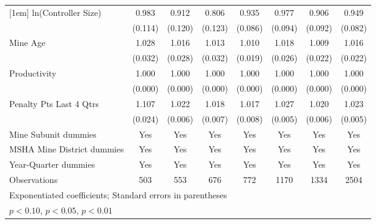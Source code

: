 {\begin{tabular}{l*{7}{c}}
[1em]
ln(Controller Size)      &       0.983         &       0.912         &       0.806         &       0.935         &       0.977         &       0.906         &       0.949         \\
                         &     (0.114)         &     (0.120)         &     (0.123)         &     (0.086)         &     (0.094)         &     (0.092)         &     (0.082)         \\
[1em]
Mine Age                 &       1.028         &       1.016         &       1.013         &       1.010         &       1.018         &       1.009         &       1.016         \\
                         &     (0.032)         &     (0.028)         &     (0.032)         &     (0.019)         &     (0.026)         &     (0.022)         &     (0.022)         \\
[1em]
Productivity             &       1.000         &       1.000         &       1.000         &       1.000         &       1.000         &       1.000         &       1.000         \\
                         &     (0.000)         &     (0.000)         &     (0.000)         &     (0.000)         &     (0.000)         &     (0.000)         &     (0.000)         \\
[1em]
Penalty Pts Last 4 Qtrs  &       1.107\sym{***}&       1.022\sym{***}&       1.018\sym{***}&       1.017\sym{**} &       1.027\sym{***}&       1.020\sym{***}&       1.023\sym{***}\\
                         &     (0.024)         &     (0.006)         &     (0.007)         &     (0.008)         &     (0.005)         &     (0.006)         &     (0.005)         \\
[1em]
Mine Subunit dummies     &         Yes         &         Yes         &         Yes         &         Yes         &         Yes         &         Yes         &         Yes         \\
[1em]
MSHA Mine District dummies&         Yes         &         Yes         &         Yes         &         Yes         &         Yes         &         Yes         &         Yes         \\
[1em]
Year-Quarter dummies     &         Yes         &         Yes         &         Yes         &         Yes         &         Yes         &         Yes         &         Yes         \\
\hline
Observations             &         503         &         553         &         676         &         772         &        1170         &        1334         &        2504         \\
\hline\hline
\multicolumn{8}{l}{\footnotesize Exponentiated coefficients; Standard errors in parentheses}\\
\multicolumn{8}{l}{\footnotesize \sym{*} \(p<0.10\), \sym{**} \(p<0.05\), \sym{***} \(p<0.01\)}\\
\end{tabular}
}
